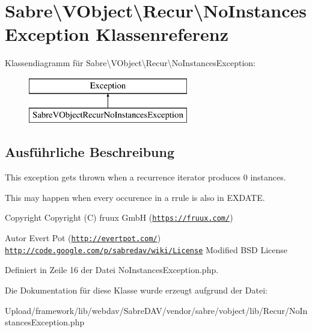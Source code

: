 \hypertarget{class_sabre_1_1_v_object_1_1_recur_1_1_no_instances_exception}{}\section{Sabre\textbackslash{}V\+Object\textbackslash{}Recur\textbackslash{}No\+Instances\+Exception Klassenreferenz}
\label{class_sabre_1_1_v_object_1_1_recur_1_1_no_instances_exception}
Klassendiagramm für Sabre\textbackslash{}V\+Object\textbackslash{}Recur\textbackslash{}No\+Instances\+Exception\+:\begin{figure}[H]
\begin{center}
\leavevmode
\includegraphics[height=2.000000cm]{class_sabre_1_1_v_object_1_1_recur_1_1_no_instances_exception}
\end{center}
\end{figure}


\subsection{Ausführliche Beschreibung}
This exception gets thrown when a recurrence iterator produces 0 instances.

This may happen when every occurence in a rrule is also in E\+X\+D\+A\+TE.

\begin{DoxyCopyright}{Copyright}
Copyright (C) fruux GmbH (\href{https://fruux.com/}{\tt https\+://fruux.\+com/}) 
\end{DoxyCopyright}
\begin{DoxyAuthor}{Autor}
Evert Pot (\href{http://evertpot.com/}{\tt http\+://evertpot.\+com/})  \href{http://code.google.com/p/sabredav/wiki/License}{\tt http\+://code.\+google.\+com/p/sabredav/wiki/\+License} Modified B\+SD License 
\end{DoxyAuthor}


Definiert in Zeile 16 der Datei No\+Instances\+Exception.\+php.



Die Dokumentation für diese Klasse wurde erzeugt aufgrund der Datei\+:\begin{DoxyCompactItemize}
\item 
Upload/framework/lib/webdav/\+Sabre\+D\+A\+V/vendor/sabre/vobject/lib/\+Recur/No\+Instances\+Exception.\+php\end{DoxyCompactItemize}
